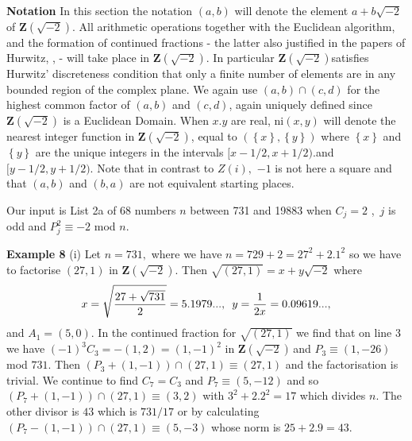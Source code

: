 \documentclass[12pt]{article}
\begin{document}
\textbf{Notation} In this section the notation $\left( a,b\right) $ will
denote the element $a+b\sqrt{-2}$ of $\mathbf{Z}\left( \sqrt{-2}\right) .$
All arithmetic operations together with the Euclidean algorithm, and the
formation of continued fractions - the latter also justified in the papers
of Hurwitz, \cite{Hurwitz:1888:UEC},\cite{Hurwitz:1889:UAK} - will take
place in $\mathbf{Z}\left( \sqrt{-2}\right) .$ In particular $\mathbf{Z}%
\left( \sqrt{-2}\right) $satisfies Hurwitz' discreteness condition that only
a finite number of elements are in any bounded region of the complex plane.
We again use $\left( a,b\right) \cap (c,d)$ for the highest common factor of 
$\left( a,b\right) $ and $\left( c,d\right) $, again uniquely defined since $%
\mathbf{Z}\left( \sqrt{-2}\right) $ is a Euclidean Domain. When $x.y$ are
real, ni$\left( x,y\right) $ will denote the nearest integer function in $%
\mathbf{Z}\left( \sqrt{-2}\right) $, equal to $\left( \left\{ x\right\}
,\left\{ y\right\} \right) $ where $\left\{ x\right\} $ and $\left\{
y\right\} $ are the unique integers in the intervals $[x-1/2,x+1/2).$and $%
[y-1/2,y+1/2).$ Note that in contrast to $Z\left( i\right) ,$ $-1$ is not
here a square and that $\left( a,b\right) $ and $\left( b,a\right) $ are not
equivalent starting places.

Our input is List 2a of 68 numbers $n$ between 731 and 19883 when $C_{j}=2$%
,\thinspace\ $j$ is odd and $P_{j}^{2}\equiv -2$ mod $n$.

\textbf{Example 8 }(i) Let $n=731,$ where we have $n=729+2=27^{2}+2.1^{2}$
so we have to factorise $\left( 27,1\right) $ in $\mathbf{Z}\left( \sqrt{-2}%
\right) .$ Then $\sqrt{\left( 27,1\right) }=x+y\sqrt{-2}$ where 
\begin{equation*}
x=\sqrt{\frac{27+\sqrt{731}}{2}}=5.1979...,\text{ \thinspace }y=\frac{1}{2x}%
=0.09619...,
\end{equation*}%
and $A_{1}=\left( 5,0\right) .$ In the continued fraction for $\sqrt{\left(
27,1\right) }$ we find that on line 3 we have $\left( -1\right)
^{3}C_{3}=-\left( 1,2\right) =\left( 1,-1\right) ^{2}$ in $\mathbf{Z}\left( 
\sqrt{-2}\right) \,$and $P_{3}\equiv \left( 1,-26\right) $ mod $731$. Then $%
(P_{3}+\left( 1,-1\right) )\cap \left( 27,1\right) \equiv \left( 27,1\right) 
$ and the factorisation is trivial. We continue to find $C_{7}=C_{3}$ and $%
P_{7}\equiv \left( 5,-12\right) $ and so $(P_{7}+\left( 1,-1\right) )\cap
\left( 27,1\right) \equiv \left( 3,2\right) $ with $3^{2}+2.2^{2}=17$ which
divides $n.$ The other divisor is $43$ which is $731/17$ or by calculating $%
(P_{7}-\left( 1,-1\right) )\cap \left( 27,1\right) \equiv \left( 5,-3\right) 
$ whose norm is $25+2.9=43.$
\end{document}
